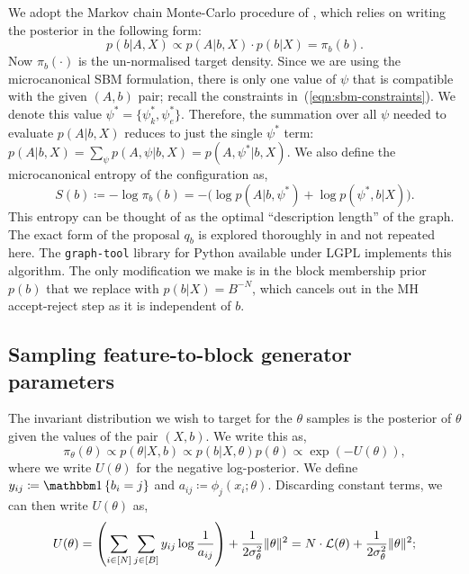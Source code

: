 We adopt the Markov chain Monte-Carlo procedure of
\cite{Peixoto-MCMC},
which relies on writing the posterior in the following form:
%
\begin{equation}
	p(b | A, X) \propto p(A | b, X) \cdot p(b | X) = \pi_b(b).
\end{equation}
%
Now $\pi_b(\cdot)$ is the un-normalised target density.
Since we are using the microcanonical SBM formulation, there is only one 
value of $\psi$ that is compatible with the given $(A, b)$ pair;
recall the constraints in~(\ref{eqn:sbm-constraints}).
We denote this value $\psi^* = \{\psi_k^*, \psi_e^*\}$. Therefore, 
the summation over all $\psi$ needed to evaluate $p(A | b, X)$ reduces to just the single $\psi^*$ term:
$p(A | b, X) = \sum_{\psi} \nolimits p(A , \psi | b, X) = p(A, \psi^* | b, X)$.
We also define the microcanonical entropy of the configuration as,
%
\begin{equation}
	S(b) \coloneqq - \log \pi_b(b) = - \Big( \log p(A | b, \psi^*) + \log p(\psi^*, b | X) \Big).
	\label{eqn:dl-form}
\end{equation}
%
This entropy can be thought of as the optimal
``description length'' of the graph. 
The exact form of the proposal $q_b$ is explored thoroughly in
\cite{Peixoto-MCMC} and not repeated here. The \verb*|graph-tool| \cite{peixoto_graph-tool_2014}
library for Python available under LGPL implements this algorithm.
The only modification we make is in 
the block membership prior $p(b)$ that we replace with $p(b|X)=B^{-N}$, 
which cancels out in the MH accept-reject step as it is independent of $b$.

\subsection{Sampling feature-to-block generator parameters}
\label{s:sfb}

The invariant distribution we wish to target for the $\theta$ samples is the posterior of $\theta$ given the values of the pair $(X, b)$. 
We write this as,
%
\begin{equation}
	\pi_\theta(\theta) \propto p(\theta | X, b) \propto p(b | X, \theta) p(\theta) \propto  \exp \left( - U(\theta) \right),
	\label{eq:U}
\end{equation}
%
where we write $U(\theta)$ for the negative log-posterior. We define $y_{ij} \coloneqq \one \left\{ b_i = j \right\}$ and $a_{ij} \coloneqq \phi_j(x_i; \theta)$. 
Discarding constant terms, we can then write $U(\theta)$ as,
%
\begin{equation}
	U(\theta) = \left( \sum_{i \in [N]} \sum_{j \in [B]} y_{ij} \log \frac{1}{a_{ij}} \right)
	+ \frac{1}{2\sigma_\theta^2} \|\theta\|^2 = N \cdot \mathcal{L}(\theta) + \frac{1}{2\sigma_\theta^2} \|\theta\|^2;
	\label{eqn:U-form}
\end{equation}

